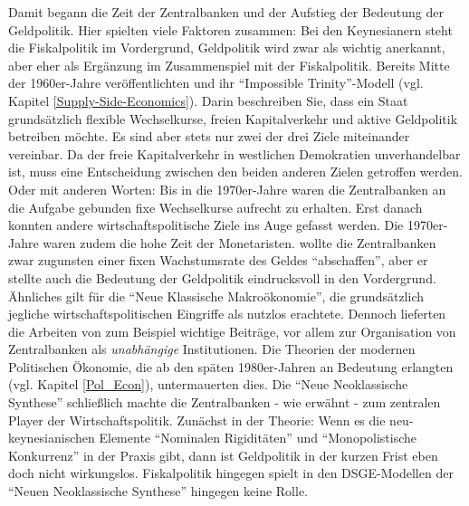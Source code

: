 Damit begann die Zeit der Zentralbanken und der Aufstieg der Bedeutung der Geldpolitik. Hier spielten viele Faktoren zusammen: Bei den Keynesianern steht die Fiskalpolitik im Vordergrund, Geldpolitik wird zwar als wichtig anerkannt, aber eher als Ergänzung im Zusammenspiel mit der Fiskalpolitik. Bereits Mitte der 1960er-Jahre veröffentlichten \textcite{Mundell1963} und \textcite{Fleming1962} ihr "`Impossible Trinity"'-Modell (vgl. Kapitel \ref{Supply-Side-Economics}). Darin beschreiben Sie, dass ein Staat grundsätzlich flexible Wechselkurse, freien Kapitalverkehr und aktive Geldpolitik betreiben möchte. Es sind aber stets nur zwei der drei Ziele miteinander vereinbar. Da der freie Kapitalverkehr in westlichen Demokratien unverhandelbar ist, muss eine Entscheidung zwischen den beiden anderen Zielen getroffen werden. Oder mit anderen Worten: Bis in die 1970er-Jahre waren die Zentralbanken an die Aufgabe gebunden fixe Wechselkurse aufrecht zu erhalten. Erst danach konnten andere wirtschaftspolitische Ziele ins Auge gefasst werden. Die 1970er-Jahre waren zudem die hohe Zeit der Monetaristen. \textcite{Friedman1968, Friedman1976b} wollte die Zentralbanken zwar zugunsten einer fixen Wachstumsrate des Geldes "`abschaffen"', aber er stellte auch die Bedeutung der Geldpolitik eindrucksvoll in den Vordergrund. Ähnliches gilt für die "`Neue Klassische Makroökonomie"', die grundsätzlich jegliche wirtschaftspolitischen Eingriffe als nutzlos erachtete. Dennoch lieferten die Arbeiten von zum Beispiel \textcite{Kydland1977, Barro1976} wichtige Beiträge, vor allem zur Organisation von Zentralbanken als \textit{unabhängige} Institutionen. Die Theorien der modernen Politischen Ökonomie, die ab den späten 1980er-Jahren an Bedeutung erlangten (vgl. Kapitel \ref{Pol_Econ}), untermauerten dies. Die "`Neue Neoklassische Synthese"' schließlich machte die Zentralbanken - wie erwähnt - zum zentralen Player der Wirtschaftspolitik. Zunächst in der Theorie: Wenn es die neu-keynesianischen Elemente "`Nominalen Rigiditäten"' und "`Monopolistische Konkurrenz"' in der Praxis gibt, dann ist Geldpolitik in der kurzen Frist eben doch nicht wirkungslos. Fiskalpolitik hingegen spielt in den DSGE-Modellen der "`Neuen Neoklassische Synthese"' hingegen keine Rolle.

